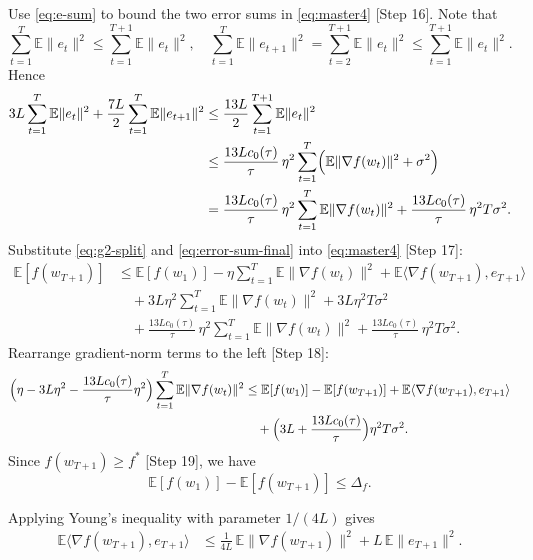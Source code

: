 \documentclass[11pt]{article}
\newcommand{\E}{\mathbb{E}}
\begin{document}
Use \eqref{eq:e-sum} to bound the two error sums in \eqref{eq:master4} [Step 16]. Note that
\[
\sum_{t=1}^{T} \E\|e_t\|^2 \le \sum_{t=1}^{T+1} \E\|e_t\|^2,\quad
\sum_{t=1}^{T} \E\|e_{t+1}\|^2 = \sum_{t=2}^{T+1} \E\|e_t\|^2 \le \sum_{t=1}^{T+1} \E\|e_t\|^2.
\]
Hence
\begin{align}
3L \sum_{t=1}^{T} \E\|e_t\|^2 + \frac{7L}{2}\sum_{t=1}^{T} \E\|e_{t+1}\|^2 
&\le \frac{13L}{2} \sum_{t=1}^{T+1} \E\|e_t\|^2 \nonumber\\
&\le \frac{13L c_0(\tau)}{\tau}\,\eta^2 \sum_{t=1}^T \Bigl(\E\|\nabla f(w_t)\|^2 + \sigma^2\Bigr) \nonumber\\
&= \frac{13L c_0(\tau)}{\tau}\,\eta^2 \sum_{t=1}^T \E\|\nabla f(w_t)\|^2 + \frac{13L c_0(\tau)}{\tau}\,\eta^2 T \sigma^2. \label{eq:error-sum-final}
\end{align}
Substitute \eqref{eq:g2-split} and \eqref{eq:error-sum-final} into \eqref{eq:master4} [Step 17]:
\begin{align}
\E[f(w_{T+1})]
&\le \E[f(w_1)] 
- \eta \sum_{t=1}^T \E\|\nabla f(w_t)\|^2 
+ \E\langle \nabla f(w_{T+1}), e_{T+1}\rangle \nonumber\\
&\quad + 3L\eta^2 \sum_{t=1}^T \E\|\nabla f(w_t)\|^2 + 3L\eta^2 T \sigma^2 \nonumber\\
&\quad + \frac{13L c_0(\tau)}{\tau}\,\eta^2 \sum_{t=1}^T \E\|\nabla f(w_t)\|^2 + \frac{13L c_0(\tau)}{\tau}\,\eta^2 T \sigma^2. \label{eq:master5}
\end{align}
Rearrange gradient-norm terms to the left [Step 18]:
\begin{align}
\Bigl(\eta - 3L\eta^2 - \frac{13L c_0(\tau)}{\tau}\eta^2\Bigr) \sum_{t=1}^T \E\|\nabla f(w_t)\|^2
&\le \E[f(w_1)] - \E[f(w_{T+1})] + \E\langle \nabla f(w_{T+1}), e_{T+1}\rangle \nonumber\\
&\quad + \Bigl(3L + \frac{13L c_0(\tau)}{\tau}\Bigr)\eta^2 T \sigma^2. \label{eq:pre-final}
\end{align}
Since $f(w_{T+1}) \ge f^*$ [Step 19], we have
\[
\E[f(w_1)] - \E[f(w_{T+1})] \le \Delta_f.
\]


Applying Young's inequality with parameter $1/(4L)$ gives
\begin{align}
\E\langle \nabla f(w_{T+1}), e_{T+1}\rangle
&\le \frac{1}{4L}\,\E\|\nabla f(w_{T+1})\|^2 + L\,\E\|e_{T+1}\|^2. \label{eq:boundary-new}
\end{align}
\end{document}

